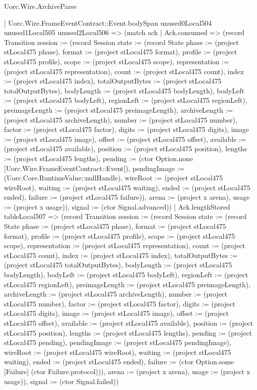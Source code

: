 \begin{lexlean}{Uorc.Wire.ArchiveParse}
\begin{semanticmodule}
{        | Uorc.Wire.FrameEventContract::Event.bodySpan unused0Local504 unused1Local505 unused2Local506 => (match ack
          | Ack.consumed => (record Transition {session := (record Session {state := (record State {phase := (project stLocal475 phase), format := (project stLocal475 format), profile := (project stLocal475 profile), scope := (project stLocal475 scope), representation := (project stLocal475 representation), count := (project stLocal475 count), index := (project stLocal475 index), totalOutputBytes := (project stLocal475 totalOutputBytes), bodyLength := (project stLocal475 bodyLength), bodyLeft := (project stLocal475 bodyLeft), regionLeft := (project stLocal475 regionLeft), preimageLength := (project stLocal475 preimageLength), archiveLength := (project stLocal475 archiveLength), number := (project stLocal475 number), factor := (project stLocal475 factor), digits := (project stLocal475 digits), image := (project stLocal475 image), offset := (project stLocal475 offset), available := (project stLocal475 available), position := (project stLocal475 position), lengths := (project stLocal475 lengths), pending := (ctor Option.none [Uorc.Wire.FrameEventContract::Event]), pendingImage := (Uorc.Core.RuntimeValue::nullHandle), wireRoot := (project stLocal475 wireRoot), waiting := (project stLocal475 waiting), ended := (project stLocal475 ended), failure := (project stLocal475 failure)}), arena := (project x arena), usage := (project x usage)}), signal := (ctor Signal.advanced)})
          | Ack.lengthStored tableLocal507 => (record Transition {session := (record Session {state := (record State {phase := (project stLocal475 phase), format := (project stLocal475 format), profile := (project stLocal475 profile), scope := (project stLocal475 scope), representation := (project stLocal475 representation), count := (project stLocal475 count), index := (project stLocal475 index), totalOutputBytes := (project stLocal475 totalOutputBytes), bodyLength := (project stLocal475 bodyLength), bodyLeft := (project stLocal475 bodyLeft), regionLeft := (project stLocal475 regionLeft), preimageLength := (project stLocal475 preimageLength), archiveLength := (project stLocal475 archiveLength), number := (project stLocal475 number), factor := (project stLocal475 factor), digits := (project stLocal475 digits), image := (project stLocal475 image), offset := (project stLocal475 offset), available := (project stLocal475 available), position := (project stLocal475 position), lengths := (project stLocal475 lengths), pending := (project stLocal475 pending), pendingImage := (project stLocal475 pendingImage), wireRoot := (project stLocal475 wireRoot), waiting := (project stLocal475 waiting), ended := (project stLocal475 ended), failure := (ctor Option.some [Failure] (ctor Failure.protocol))}), arena := (project x arena), usage := (project x usage)}), signal := (ctor Signal.failed)})
}
\end{semanticmodule}
\end{lexlean}
